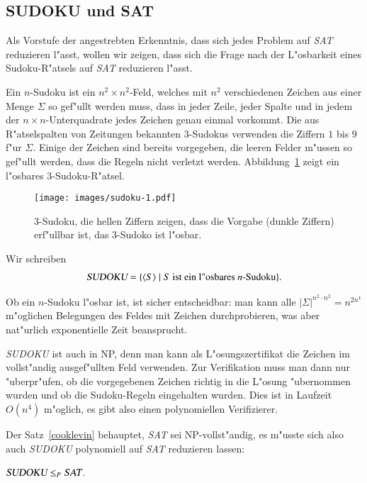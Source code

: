 \subsection{SUDOKU und SAT\label{subsection:sudoku-und-sat}}
Als Vorstufe der angestrebten Erkenntnis, dass sich jedes Problem auf \textsl{SAT}
reduzieren l"asst, wollen wir zeigen, dass sich die Frage nach der
L"osbarkeit eines Sudoku-R"atsels auf \textsl{SAT} reduzieren l"asst.

Ein $n$-Sudoku ist ein $n^2\times n^2$-Feld, welches mit $n^2$ verschiedenen
Zeichen aus einer Menge $\Sigma$ so gef"ullt werden muss,
dass in jeder Zeile, jeder Spalte
und in jedem der $n\times n$-Unterquadrate jedes Zeichen genau einmal
vorkommt.
Die aus R"atselspalten von Zeitungen bekannten $3$-Sudokus verwenden
die Ziffern $1$ bis $9$ f"ur $\Sigma$.
Einige der Zeichen sind bereits vorgegeben, die leeren Felder m"ussen
so gef"ullt werden, dass die Regeln nicht verletzt werden.
Abbildung~\ref{sudoku} zeigt ein l"osbares $3$-Sudoku-R"atsel.
\begin{figure}
\begin{center}
\texttt{[image: images/sudoku-1.pdf]}
\end{center}
\caption{$3$-Sudoku, die hellen Ziffern zeigen, dass die Vorgabe (dunkle
Ziffern) erf"ullbar ist, das $3$-Sudoko ist l"osbar.\label{sudoku}}
\end{figure}
Wir schreiben
\begin{align*}
\textsl{SUDOKU}
=
\{\langle S\rangle\;|\; \text{$S$ ist ein l"osbares $n$-Sudoku}\}.
\end{align*}

Ob ein $n$-Sudoku l"osbar ist, ist sicher entscheidbar: man kann alle
$|\Sigma|^{n^2\cdot n^2}=n^{2n^4}$ m"oglichen Belegungen des Feldes mit
Zeichen durchprobieren, was aber nat"urlich exponentielle Zeit
beansprucht.

\textsl{SUDOKU} ist auch in NP, denn man kann als L"osungszertifikat
die Zeichen im vollst"andig ausgef"ullten Feld verwenden.
Zur Verifikation muss man dann nur "uberpr"ufen, ob die
vorgegebenen Zeichen richtig in die L"osung "ubernommen wurden und
ob die Sudoku-Regeln eingehalten wurden. Dies ist in Laufzeit $O(n^4)$
m"oglich, es gibt also einen polynomiellen Verifizierer.

Der Satz~\ref{cooklevin} behauptet, \textsl{SAT} sei NP-vollst"andig,
es m"usste sich also auch \textsl{SUDOKU} polynomiell auf \textsl{SAT}
reduzieren lassen:

\begin{satz} $\textsl{SUDOKU}\le_P\textsl{SAT}$.
\label{skript:satz:sudoku-sat}
\end{satz}

